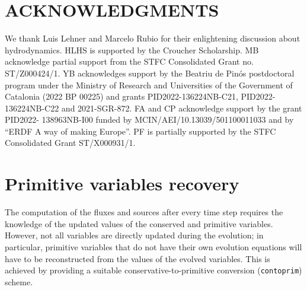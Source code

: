 \documentclass[prd,aps,twocolumn,floats,floatfix,nofootinbib,superscriptaddress] {revtex4-1}
\begin{document}
\section{ACKNOWLEDGMENTS}

We thank Luis Lehner and Marcelo Rubio for their enlightening discussion about hydrodynamics.  HLHS is supported by the Croucher Scholarship.
%
MB acknowledge partial support from the STFC Consolidated Grant no. ST/Z000424/1.
%
YB acknowledges support by the Beatriu
de Pinós postdoctoral program under the Ministry of Research and Universities of the Government of Catalonia (2022 BP 00225)
and grants PID2022-136224NB-C21, PID2022-
136224NB-C22 and 2021-SGR-872. 
%
FA and CP acknowledge support by the grant PID2022-
138963NB-I00  funded by
MCIN/AEI/10.13039/501100011033 and by “ERDF A
way of making Europe''.
%
PF is partially supported by  the STFC Consolidated Grant
ST/X000931/1.




\appendix


\section{Primitive variables recovery}\label{con2prim_appendix}

The computation of the fluxes and sources after every time step requires the knowledge of the updated values of the conserved and primitive variables.  However, not all variables are directly updated during the evolution; in particular, primitive variables that do not have their own evolution equations will have to be reconstructed from the values of the evolved variables.  This is achieved by providing a suitable conservative-to-primitive conversion (\verb|contoprim|) scheme.
\end{document}
